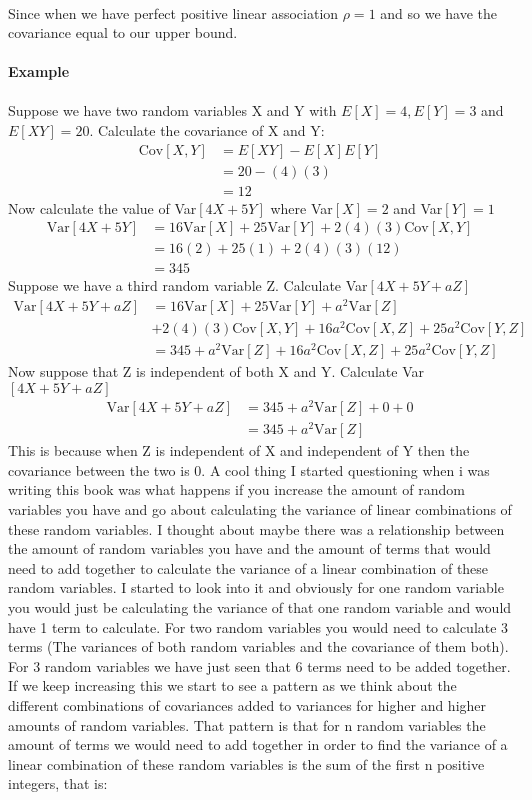 \documentclass[,oneside]{article}
\begin{document}
\begin{enumerate}
\begin{align*}
\end{align*}
Since when we have perfect positive linear association $\rho = 1$ and so we have the covariance equal to our upper bound.\\ \\
\textbf{Example}\\ \\
Suppose we have two random variables X and Y with $E[X]=4, E[Y]=3$ and $E[XY]=20$. Calculate the covariance of X and Y:
\begin{align*}
\text{Cov}[X,Y]&=E[XY]-E[X]E[Y]\\
&= 20 - (4)(3)\\
&= 12
\end{align*}
Now calculate the value of Var$[4X+5Y]$ where Var$[X]=2$ and Var$[Y]=1$
\begin{align*}
\text{Var}[4X+5Y]&= 16\text{Var}[X]+25\text{Var}[Y]+2(4)(3)\text{Cov}[X,Y]\\
&= 16(2)+25(1)+2(4)(3)(12)\\
&= 345
\end{align*}
Suppose we have a third random variable Z. Calculate Var$[4X+5Y+aZ]$
\begin{align*}
\text{Var}[4X+5Y+aZ]&= 16\text{Var}[X]+25\text{Var}[Y]+a^2\text{Var}[Z]\\
&+2(4)(3)\text{Cov}[X,Y]+16a^2\text{Cov}[X,Z]+25a^2\text{Cov}[Y,Z]\\
&=345+a^2\text{Var}[Z]+16a^2\text{Cov}[X,Z]+25a^2\text{Cov}[Y,Z]
\end{align*}
Now suppose that Z is independent of both X and Y. Calculate Var$[4X+5Y+aZ]$
\begin{align*}
\text{Var}[4X+5Y+aZ]&=345+a^2\text{Var}[Z]+0+0\\
&= 345+a^2\text{Var}[Z]
\end{align*}
This is because when Z is independent of X and independent of Y then the covariance between the two is 0. A cool thing I started questioning when i was writing this book was what happens if you increase the amount of random variables you have and go about calculating the variance of linear combinations of these random variables. I thought about maybe there was a relationship between the amount of random variables you have and the amount of terms that would need to add together to calculate the variance of a linear combination of these random variables. I started to look into it and obviously for one random variable you would just be calculating the variance of that one random variable and would have 1 term to calculate. For two random variables you would need to calculate 3 terms (The variances of both random variables and the covariance of them both). For 3 random variables we have just seen that 6 terms need to be added together. If we keep increasing this we start to see a pattern as we think about the different combinations of covariances added to variances for higher and higher amounts of random variables. That pattern is that for n random variables the amount of terms we would need to add together in order to find the variance of a linear combination of these random variables is the sum of the first n positive integers, that is:

\end{enumerate}
\end{document}
